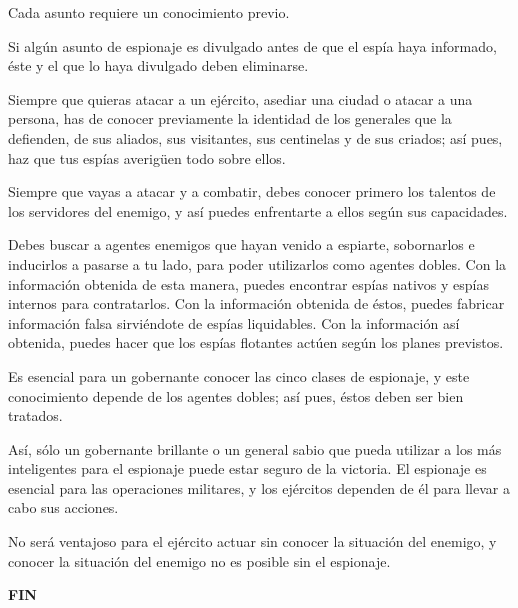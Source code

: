 Cada asunto requiere un conocimiento previo.

Si algún asunto de espionaje es divulgado antes de que el espía haya informado, éste y el que lo haya divulgado deben eliminarse.

Siempre que quieras atacar a un ejército, asediar una ciudad o atacar a una persona, has de conocer previamente la identidad de los generales que la defienden, de sus aliados, sus visitantes, sus centinelas y de sus criados; así pues, haz que tus espías averigüen todo sobre ellos.

Siempre que vayas a atacar y a combatir, debes conocer primero los talentos de los servidores del enemigo, y así puedes enfrentarte a ellos según sus capacidades.

Debes buscar a agentes enemigos que hayan venido a espiarte, sobornarlos e inducirlos a pasarse a tu lado, para poder utilizarlos como agentes dobles. Con la información obtenida de esta manera, puedes encontrar espías nativos y espías internos para contratarlos. Con la información obtenida de éstos, puedes fabricar información falsa sirviéndote de espías liquidables. Con la información así obtenida, puedes hacer que los espías flotantes actúen según los planes previstos.

Es esencial para un gobernante conocer las cinco clases de espionaje, y este conocimiento depende de los agentes dobles; así pues, éstos deben ser bien tratados.

Así, sólo un gobernante brillante o un general sabio que pueda utilizar a los más inteligentes para el espionaje puede estar seguro de la victoria. El espionaje es esencial para las operaciones militares, y los ejércitos dependen de él para llevar a cabo sus acciones.

No será ventajoso para el ejército actuar sin conocer la situación del enemigo, y conocer la situación del enemigo no es posible sin el espionaje.

\centering
\vspace{11mm}
\Huge\textbf{FIN}
